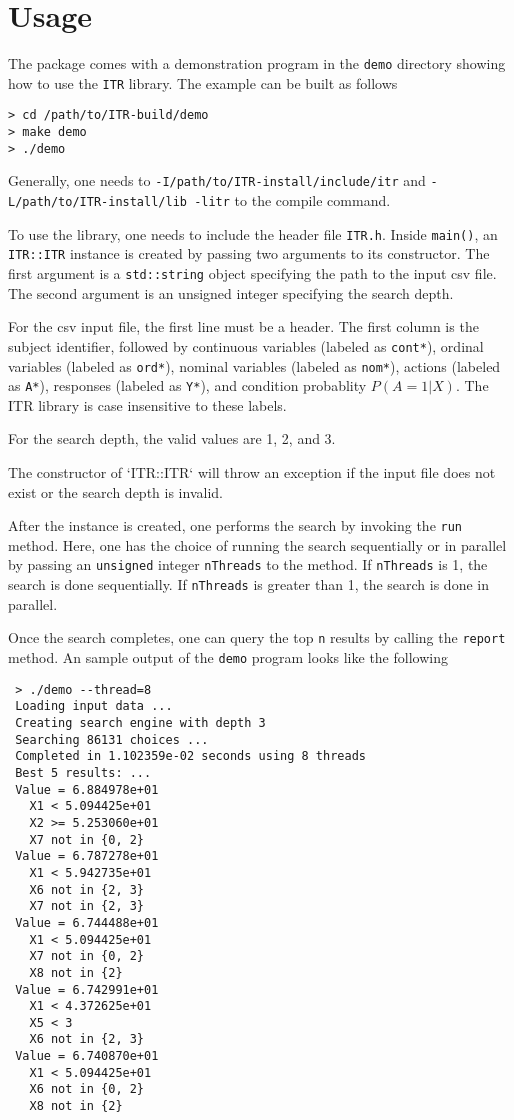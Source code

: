 \chapter{Usage}

The package comes with a demonstration program in the {\tt demo} directory
showing how to use the {\tt ITR} library. The  example can be built as follows
\begin{verbatim}
> cd /path/to/ITR-build/demo
> make demo
> ./demo
\end{verbatim}
Generally, one needs to {\tt -I/path/to/ITR-install/include/itr} and
{\tt -L/path/to/ITR-install/lib -litr} to the compile command. 

To use the library, one needs to include the header file {\tt ITR.h}. Inside
{\tt main()}, an {\tt ITR::ITR} instance is created by passing two arguments to
its constructor. The first argument is a {\tt std::string} object specifying the
path to the input csv file. The second argument is an unsigned integer specifying
the search depth. 

For the csv input file, the first line must be a header. The first column is the
subject identifier, followed by continuous variables (labeled as {\tt cont*}), ordinal
variables (labeled as {\tt ord*}), nominal variables (labeled as {\tt nom*}),
actions (labeled as {\tt A*}), responses (labeled as {\tt Y*}), and condition
probablity $P(A = 1 | X)$. The ITR library is case insensitive to these labels.

For the search depth, the valid values are 1, 2, and 3.   

The constructor of `ITR::ITR` will throw an exception if the input file does not
exist or the search depth is invalid. 

After the instance is created, one performs the search by invoking the {\tt run}
method. Here, one has the choice of running the search sequentially or in
parallel by passing an {\tt unsigned} integer {\tt nThreads} to the method. If
{\tt nThreads} is 1, the search is done sequentially. If {\tt nThreads} is greater
than 1, the search is done in parallel. 

Once the search completes, one can query the top {\tt n} results by calling the
{\tt report} method. An sample output of the {\tt demo} program looks like the following
\begin{verbatim}
 > ./demo --thread=8
 Loading input data ...
 Creating search engine with depth 3
 Searching 86131 choices ...
 Completed in 1.102359e-02 seconds using 8 threads
 Best 5 results: ...
 Value = 6.884978e+01
   X1 < 5.094425e+01
   X2 >= 5.253060e+01
   X7 not in {0, 2} 
 Value = 6.787278e+01
   X1 < 5.942735e+01
   X6 not in {2, 3} 
   X7 not in {2, 3} 
 Value = 6.744488e+01
   X1 < 5.094425e+01
   X7 not in {0, 2} 
   X8 not in {2} 
 Value = 6.742991e+01
   X1 < 4.372625e+01
   X5 < 3
   X6 not in {2, 3} 
 Value = 6.740870e+01
   X1 < 5.094425e+01
   X6 not in {0, 2} 
   X8 not in {2} 
\end{verbatim}


